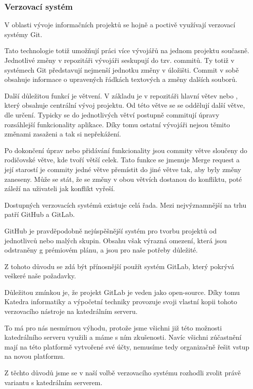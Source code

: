 \documentclass[czech,BP]{thesiskiv}
\begin{document}
\subsubsection{Verzovací systém}
\par V oblasti vývoje informačních projektů se hojně a poctivě využívají verzovací systémy Git.
\par Tato technologie totiž umožňují práci více vývojářů na jednom projektu současně. Jednotlivé změny v repozitáři vývojáři seskupují do tzv. commitů. Ty totiž v systémech Git představují nejmenší jednotku změny v úložišti. Commit v sobě obsahuje informace o upravených řádkách textových a změny dalších souborů.
\par Další důležitou funkcí je větvení. V základu je v repozitáři hlavní větev  nebo , který obsahuje centrální vývoj projektu. Od této větve se se oddělují další větve, dle určení. Typicky se do jednotlivých větví postupně commitují úpravy rozsáhlejší funkcionality aplikace. Díky tomu ostatní vývojáři nejsou těmito změnami zasaženi a tak si nepřekážení.
\par Po dokončení úprav nebo přidávání funkcionality jsou commity větve sloučeny do rodičovské větve, kde tvoří větší celek. Tato funkce se jmenuje Merge request a její starostí je commity jedné větve přemístit do jiné větve tak, aby byly změny zaneseny. Může se stát, že se změny v obou větvích dostanou do konfliktu, poté záleží na uživateli jak konflikt vyřeší.
\par Dostupných verzovacích systémů existuje celá řada. Mezi nejvýznamnější na trhu patří GitHub a GitLab.
\par GitHub je pravděpodobně nejúspěšnější systém pro tvorbu projektů od jednotlivců nebo malých skupin. Obsahu však výrazná omezení, která jsou odstraněny g prémiovém plánu, a jsou pro naše potřeby důležité.
\par Z tohoto důvodu se zdá být přínosnější použít systém GitLab, který pokrývá veškeré naše požadavky. 
\par Důležitou zmínkou je, že projekt GitLab je veden jako open-source. Díky tomu Katedra informatiky a výpočetní techniky provozuje svoji vlastní kopii tohoto verzovacího nástroje na katedrálním serveru.
\par To má pro nás nesmírnou výhodu, protože jsme všichni již této možnosti katedrálního serveru využili a máme s ním zkušenosti. Navíc všichni zúčastnění mají na této platformě vytvořené své účty, nemusíme tedy organizačně řešit vstup na novou platformu.
\par Z těchto důvodů jsme se v naší volbě verzovacího systému rozhodli zvolit právě variantu s katedrálním serverem.
\end{document}
